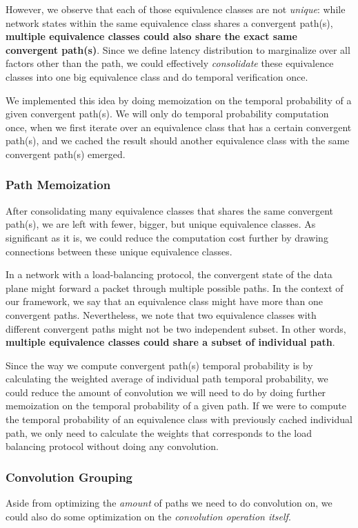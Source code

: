 \documentclass[10pt,sigconf,letterpaper,anonymous,nonacm]{acmart}
\begin{document}
However, we observe that each of those equivalence classes are not \textit{unique}: while network states within 
the same equivalence class shares a convergent path(s), \textbf{multiple equivalence classes could also 
share the exact same convergent path(s)}.
Since we define latency distribution to marginalize over all factors other than the path, we could 
effectively \textit{consolidate} these equivalence classes into one big equivalence class and do temporal 
verification once.

We implemented this idea by doing memoization on the temporal probability of a given convergent path(s).
We will only do temporal probability computation once, when we first iterate over an equivalence class that 
has a certain convergent path(s), and we cached the result should another equivalence class with the same 
convergent path(s) emerged.

\subsubsection{Path Memoization}
After consolidating many equivalence classes that shares the same convergent path(s), we are left with fewer, 
bigger, but unique equivalence classes.
As significant as it is, we could reduce the computation cost further by drawing connections between these 
unique equivalence classes.

In a network with a load-balancing protocol, the convergent state of the data plane might forward a packet 
through multiple possible paths.
In the context of our framework, we say that an equivalence class might have more than one convergent paths.
Nevertheless, we note that two equivalence classes with different convergent paths might not be two 
independent subset.
In other words, \textbf{multiple equivalence classes could share a subset of individual path}.


Since the way we compute convergent path(s) temporal probability is by calculating the weighted average of 
individual path temporal probability, we could reduce the amount of convolution we will need to do by doing further memoization 
on the temporal probability of a given path.
If we were to compute the temporal probability of an equivalence class with previously cached individual 
path, we only need to calculate the weights that corresponds to the load balancing protocol without 
doing any convolution.

\subsubsection{Convolution Grouping}
Aside from optimizing the \textit{amount} of paths we need to do convolution on, we could also do some 
optimization on the \textit{convolution operation itself}. 
\end{document}
